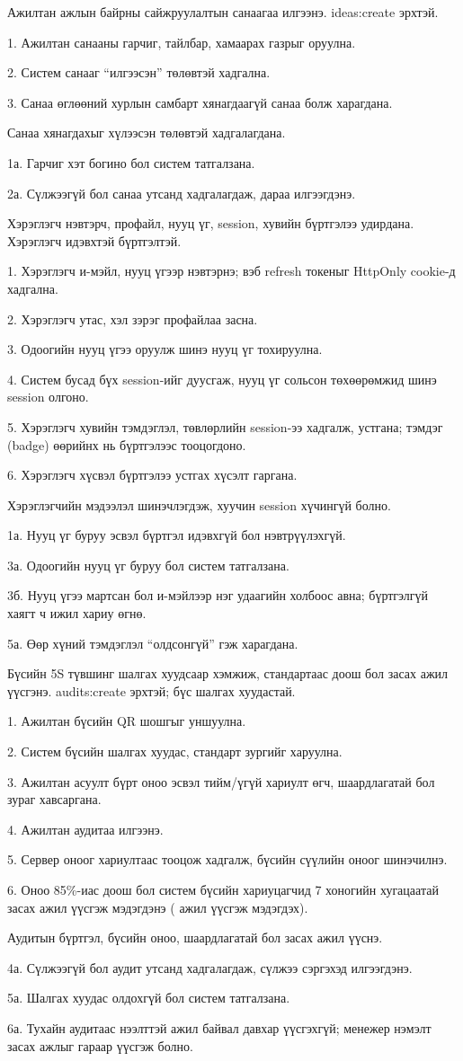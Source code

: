 {Ажилтан ажлын байрны сайжруулалтын санаагаа илгээнэ.}
{ideas:create эрхтэй.}
{1. Ажилтан санааны гарчиг, тайлбар, хамаарах газрыг оруулна.\par
 2. Систем санааг ``илгээсэн'' төлөвтэй хадгална.\par
 3. Санаа өглөөний хурлын самбарт хянагдаагүй санаа болж харагдана.}
{Санаа хянагдахыг хүлээсэн төлөвтэй хадгалагдана.}
{1а. Гарчиг хэт богино бол систем татгалзана.\par
 2а. Сүлжээгүй бол санаа утсанд хадгалагдаж, дараа илгээгдэнэ.}

{Хэрэглэгч нэвтэрч, профайл, нууц үг, session, хувийн бүртгэлээ удирдана.}
{Хэрэглэгч идэвхтэй бүртгэлтэй.}
{1. Хэрэглэгч и-мэйл, нууц үгээр нэвтэрнэ; вэб refresh токеныг HttpOnly cookie-д хадгална.\par
 2. Хэрэглэгч утас, хэл зэрэг профайлаа засна.\par
 3. Одоогийн нууц үгээ оруулж шинэ нууц үг тохируулна.\par
 4. Систем бусад бүх session-ийг дуусгаж, нууц үг сольсон төхөөрөмжид шинэ session олгоно.\par
 5. Хэрэглэгч хувийн тэмдэглэл, төвлөрлийн session-ээ хадгалж, устгана; тэмдэг (badge) өөрийнх нь бүртгэлээс тооцогдоно.\par
 6. Хэрэглэгч хүсвэл бүртгэлээ устгах хүсэлт гаргана.}
{Хэрэглэгчийн мэдээлэл шинэчлэгдэж, хуучин session хүчингүй болно.}
{1а. Нууц үг буруу эсвэл бүртгэл идэвхгүй бол нэвтрүүлэхгүй.\par
 3а. Одоогийн нууц үг буруу бол систем татгалзана.\par
 3б. Нууц үгээ мартсан бол и-мэйлээр нэг удаагийн холбоос авна; бүртгэлгүй хаягт ч ижил хариу өгнө.\par
 5а. Өөр хүний тэмдэглэл ``олдсонгүй'' гэж харагдана.}

{Бүсийн 5S түвшинг шалгах хуудсаар хэмжиж, стандартаас доош бол засах ажил үүсгэнэ.}
{audits:create эрхтэй; бүс шалгах хуудастай.}
{1. Ажилтан бүсийн QR шошгыг уншуулна.\par
 2. Систем бүсийн шалгах хуудас, стандарт зургийг харуулна.\par
 3. Ажилтан асуулт бүрт оноо эсвэл тийм/үгүй хариулт өгч, шаардлагатай бол зураг хавсаргана.\par
 4. Ажилтан аудитаа илгээнэ.\par
 5. Сервер оноог хариултаас тооцож хадгалж, бүсийн сүүлийн оноог шинэчилнэ.\par
 6. Оноо 85\%-иас доош бол систем бүсийн хариуцагчид 7 хоногийн хугацаатай засах ажил үүсгэж мэдэгдэнэ ( ажил үүсгэж мэдэгдэх).}
{Аудитын бүртгэл, бүсийн оноо, шаардлагатай бол засах ажил үүснэ.}
{4а. Сүлжээгүй бол аудит утсанд хадгалагдаж, сүлжээ сэргэхэд илгээгдэнэ.\par
 5а. Шалгах хуудас олдохгүй бол систем татгалзана.\par
 6а. Тухайн аудитаас нээлттэй ажил байвал давхар үүсгэхгүй; менежер нэмэлт засах ажлыг гараар үүсгэж болно.}

